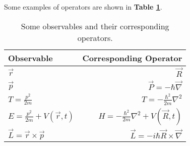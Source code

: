 Some examples of operators are shown in \textbf{Table \ref{operators}}.

\begin{table}[htbp] \label{operators}
    \def\arraystretch{1.5}
    \centering
    \begin{tabular}{lr}
        \hline
        \textbf{Observable} & \textbf{Corresponding Operator} \\
        \hline
        $\vec{r}$ & $\vec{R}$ \\
        $\vec{p}$ & $\vec{P} = -\hbar \vec{\nabla}$ \\
        $T = \frac{p^2}{2m}$ & $T = -\frac{\hbar^2}{2m}\nabla^2$ \\
        $E = \frac{p^2}{2m} + V(\vec{r}, t)$ & $H = -\frac{\hbar^2}{2m}\nabla^2 + V(\vec{R}, t)$ \\
        $\vec{L} = \vec{r}\times\vec{p}$ & $\vec{L} = -i\hbar\vec{R}\times\vec{\nabla}$ \\
        \hline
    \end{tabular}
    \caption{Some observables and their corresponding operators.}
\end{table}
